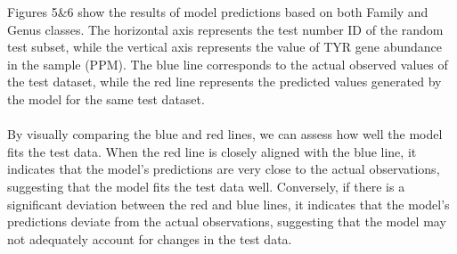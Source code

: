 \documentclass[12pt]{article}
\begin{document}
Figures 5\&6 show the results of model predictions based on both Family and Genus classes. The horizontal axis represents the test number ID of the random test subset, while the vertical axis represents the value of TYR gene abundance in the sample (PPM). The blue line corresponds to the actual observed values of the test dataset, while the red line represents the predicted values generated by the model for the same test dataset.\\\\
By visually comparing the blue and red lines, we can assess how well the model fits the test data. When the red line is closely aligned with the blue line, it indicates that the model's predictions are very close to the actual observations, suggesting that the model fits the test data well. Conversely, if there is a significant deviation between the red and blue lines, it indicates that the model's predictions deviate from the actual observations, suggesting that the model may not adequately account for changes in the test data.
\end{document}
